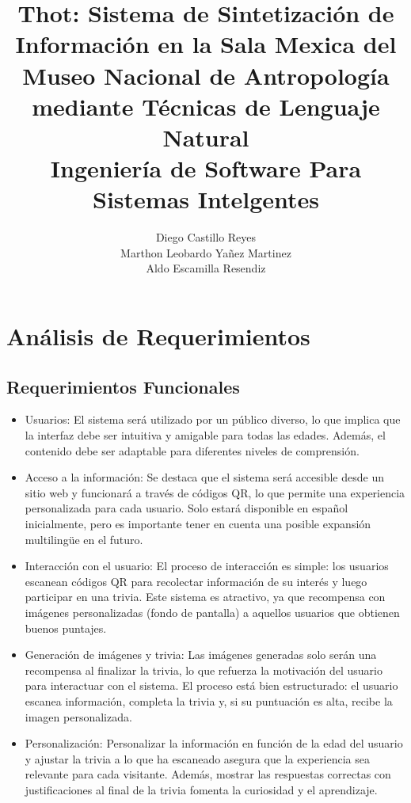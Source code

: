 \documentclass{report}
\title{\Huge{\textbf{Thot: Sistema de Sintetización de Información en la Sala Mexica del Museo Nacional de Antropología mediante Técnicas de Lenguaje Natural}}\\
    \Large{\textbf{Ingeniería de Software Para Sistemas Intelgentes}}}
\author{Diego Castillo Reyes\\Marthon Leobardo Yañez Martinez\\Aldo Escamilla Resendiz}
\begin{document}
        \maketitle
        \tableofcontents
        \newpage
        \justifying 
        \section{Análisis de Requerimientos}
    \subsection*{Requerimientos Funcionales}
    \begin{itemize}
        \item Usuarios: El sistema será utilizado por un público diverso, lo que implica que la interfaz debe ser intuitiva y amigable para todas las edades. Además, el contenido debe ser adaptable para diferentes niveles de comprensión.
        \item Acceso a la información: Se destaca que el sistema será accesible desde un sitio web y funcionará a través de códigos QR, lo que permite una experiencia personalizada para cada usuario. Solo estará disponible en español inicialmente, pero es importante tener en cuenta una posible expansión multilingüe en el futuro.
        \item Interacción con el usuario: El proceso de interacción es simple: los usuarios escanean códigos QR para recolectar información de su interés y luego participar en una trivia. Este sistema es atractivo, ya que recompensa con imágenes personalizadas (fondo de pantalla) a aquellos usuarios que obtienen buenos puntajes.
        \item Generación de imágenes y trivia: Las imágenes generadas solo serán una recompensa al finalizar la trivia, lo que refuerza la motivación del usuario para interactuar con el sistema. El proceso está bien estructurado: el usuario escanea información, completa la trivia y, si su puntuación es alta, recibe la imagen personalizada.
        \item Personalización: Personalizar la información en función de la edad del usuario y ajustar la trivia a lo que ha escaneado asegura que la experiencia sea relevante para cada visitante. Además, mostrar las respuestas correctas con justificaciones al final de la trivia fomenta la curiosidad y el aprendizaje.
    \end{itemize}
\end{document}
